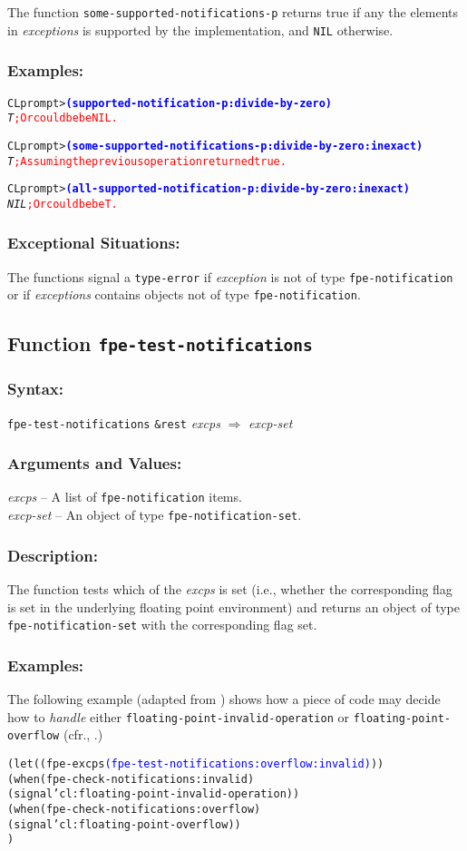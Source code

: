 \documentclass[10pt,fleqn]{article}
\newcommand{\code}[1]{\texttt{#1}}
\newcommand{\varname}[1]{\textit{#1}}
\newcommand{\codeprompt}[1]{\textcolor{blue}{\textbf{#1}}}
\newcommand{\DDictionaryItem}[1]{\vspace*{6pt}\noindent\hrulefill\vspace*{-9pt}\subsection*{#1}}
\newcommand{\DSyntax}{\subsubsection*{Syntax:}}
\newcommand{\DArgsNValues}{\subsubsection*{Arguments and Values:}}
\newcommand{\DDescription}{\subsubsection*{Description:}}
\newcommand{\DExamples}{\subsubsection*{Examples:}}
\newcommand{\DExceptional}{\subsubsection*{Exceptional Situations:}}
\begin{document}
The function \code{some-supported-notifications-p} returns true if any the
elements in \varname{exceptions} is supported by the implementation,
and \code{NIL} otherwise.

\DExamples{}

\begin{alltt}
CL prompt> \codeprompt{(supported-notification-p :divide-by-zero)}
\textit{T} \textcolor{red}{; Or could be be NIL.}

CL prompt> \codeprompt{(some-supported-notifications-p :divide-by-zero :inexact)}
\textit{T} \textcolor{red}{; Assuming the previous operation returned true.}

CL prompt> \codeprompt{(all-supported-notification-p :divide-by-zero :inexact)}
\textit{NIL} \textcolor{red}{; Or could be be T.}
\end{alltt}

\DExceptional{}

The functions signal a \code{type-error} if \varname{exception}
is not of type \code{fpe-notification} or if \varname{exceptions} contains
objects not of type \code{fpe-notification}.


\DDictionaryItem{Function \code{fpe-test-notifications}}
\index{F!\code{fpe-test-notifications}}

\DSyntax{}

\code{fpe-test-notifications} \code{\&rest} \varname{excps}
$\Rightarrow$ \varname{excp-set}

\DArgsNValues{}

\varname{excps} -- A list of \code{fpe-notification} items.\\
\varname{excp-set} -- An object of type \code{fpe-notification-set}.

\DDescription{}

The function tests which of the \varname{excps} is set (i.e., whether
the corresponding flag is set in the underlying floating point
environment) and returns an object of type \code{fpe-notification-set}
with the corresponding flag set.

\DExamples{}

The following example (adapted from \cite{2018:C18}) shows how a piece of
code may decide how to \emph{handle} either
\code{floating-point-invalid-operation} or
\code{floating-point-overflow} (cfr., \cite{1996:ANSIHyperSpec}.)

\begin{alltt}
(let ((fpe-excps \textcolor{blue}{(fpe-test-notifications :overflow :invalid)}))
   (when (fpe-check-notifications :invalid)
     (signal 'cl:floating-point-invalid-operation))
   (when (fpe-check-notifications :overflow)
     (signal 'cl:floating-point-overflow))
   )
\end{alltt}
\end{document}
